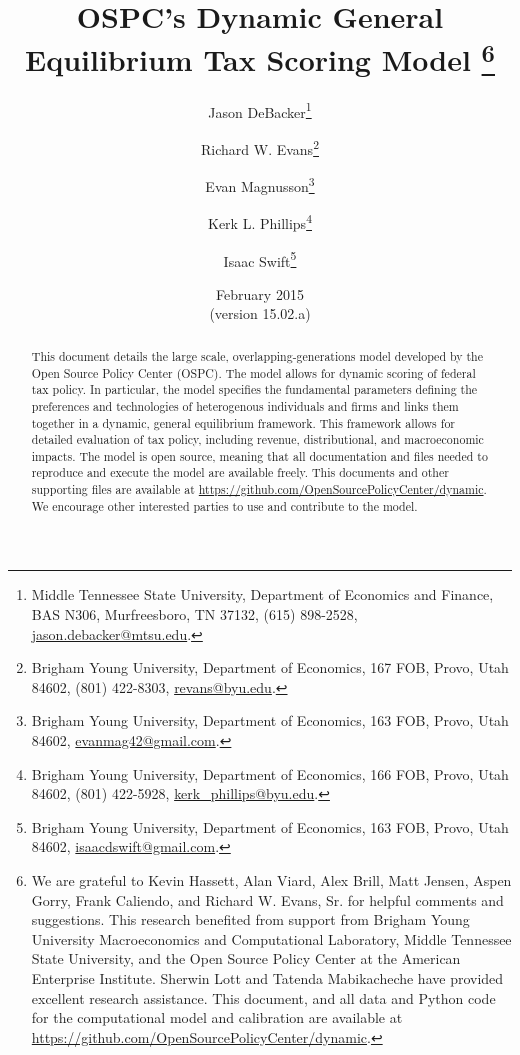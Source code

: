 \documentclass[12pt]{report}
\theoremstyle{definition}
\begin{document}
\begin{titlepage}
  \title{OSPC's Dynamic General Equilibrium Tax Scoring Model
    \thanks{We are grateful to Kevin Hassett, Alan Viard, Alex Brill, Matt Jensen, Aspen Gorry, Frank Caliendo, and Richard W. Evans, Sr. for helpful comments and suggestions. This research benefited from support from Brigham Young University Macroeconomics and Computational Laboratory, Middle Tennessee State University, and the Open Source Policy Center at the American Enterprise Institute. Sherwin Lott and Tatenda Mabikacheche have provided excellent research assistance.  This document, and all data and Python code for the computational model and calibration are available at \href{https://github.com/OpenSourcePolicyCenter/dynamic}{https://github.com/OpenSourcePolicyCenter/dynamic}.} }

  \author{
  Jason DeBacker\footnote{Middle Tennessee State University, Department of Economics and Finance, BAS N306, Murfreesboro, TN 37132, (615) 898-2528, \href{mailto:jason.debacker@mtsu.edu}{jason.debacker@mtsu.edu}.} \\[-2pt]
  \and
  Richard W. Evans\footnote{Brigham Young University, Department of Economics, 167 FOB, Provo, Utah 84602, (801) 422-8303, \href{mailto:revans@byu.edu}{revans@byu.edu}.} \\[-2pt]
  \and
  Evan Magnusson\footnote{Brigham Young University, Department of Economics, 163 FOB, Provo, Utah 84602, \href{mailto:evanmag42@gmail.com}{evanmag42@gmail.com}.} \\[-2pt]
  \and
  Kerk L. Phillips\footnote{Brigham Young University, Department of Economics, 166 FOB, Provo, Utah 84602, (801) 422-5928, \href{mailto:kerk_phillips@byu.edu}{kerk\_phillips@byu.edu}.} \\[-2pt]
  \and
  Isaac Swift\footnote{Brigham Young University, Department of Economics, 163 FOB, Provo, Utah 84602, \href{mailto:isaacdswift@gmail.com}{isaacdswift@gmail.com}.} \\[-2pt]}
  \date{February 2015 \\
  \scriptsize{(version 15.02.a)}}
  \maketitle
  \begin{abstract}
  \small{This document details the large scale, overlapping-generations model developed by the Open Source Policy Center (OSPC).  The model allows for dynamic scoring of federal tax policy.  In particular, the model specifies the fundamental parameters defining the preferences and technologies of heterogenous individuals and firms and links them together in a dynamic, general equilibrium framework.  This framework allows for detailed evaluation of tax policy, including revenue, distributional, and macroeconomic impacts.  The model is open source, meaning that all documentation and files needed to reproduce and execute the model are available freely.  This documents and other supporting files are available at \href{https://github.com/OpenSourcePolicyCenter/dynamic}{https://github.com/OpenSourcePolicyCenter/dynamic}.  We encourage other interested parties to use and contribute to the model.}


\end{abstract}
\end{titlepage}
\end{document}
